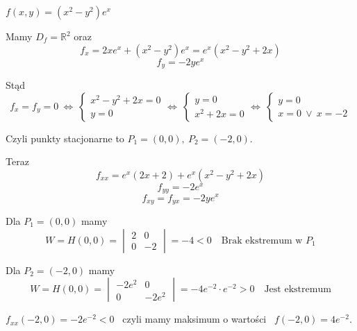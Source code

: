 \begin{przyklad}
    $ f(x,y) = (x^2 - y^2)e^x $
    
    Mamy $ D_f = \mathbb{R}^2 $ oraz
    $$ f_x = 2xe^x + (x^2 - y^2)e^x = e^x(x^2 - y^2 + 2x) $$
    $$ f_y = -2ye^x $$

    Stąd
    $$ f_x = f_y = 0 \ \Leftrightarrow \ \begin{cases} x^2 - y^2 + 2x = 0 \\ y = 0 \end{cases} \Leftrightarrow \
    \begin{cases} y = 0 \\ x^2 + 2x = 0 \end{cases} \Leftrightarrow \ \begin{cases} y = 0 \\ x = 0 \ \lor \ x=-2 \end{cases} $$

    Czyli punkty stacjonarne to $ P_1 = (0,0), \ P_2 = (-2, 0) $.

    Teraz
    $$ f_{xx} = e^x(2x + 2) + e^x(x^2 - y^2 + 2x) $$
    $$ f_{yy} = -2e^x $$
    $$ f_{xy} = f_{yx} = -2ye^x $$

    Dla $ P_1 = (0,0) $ mamy
    $$ W = H(0,0) = \begin{vmatrix} 2 & 0 \\ 0 & -2 \end{vmatrix} = -4 < 0 \quad \textrm{Brak ekstremum w } P_1 $$

    Dla $ P_2 = (-2, 0) $ mamy
    $$ W = H(0,0) = \begin{vmatrix} -2e^2 & 0 \\ 0 & -2e^2 \end{vmatrix} = -4e^{-2} \cdot e^{-2} > 0 \quad \textrm{Jest ekstremum} $$

    $ f_{xx}(-2, 0) = -2e^{-2} < 0 $ \ czyli mamy maksimum o wartości \ $ f(-2, 0) = 4e^{-2} $.
\end{przyklad}

